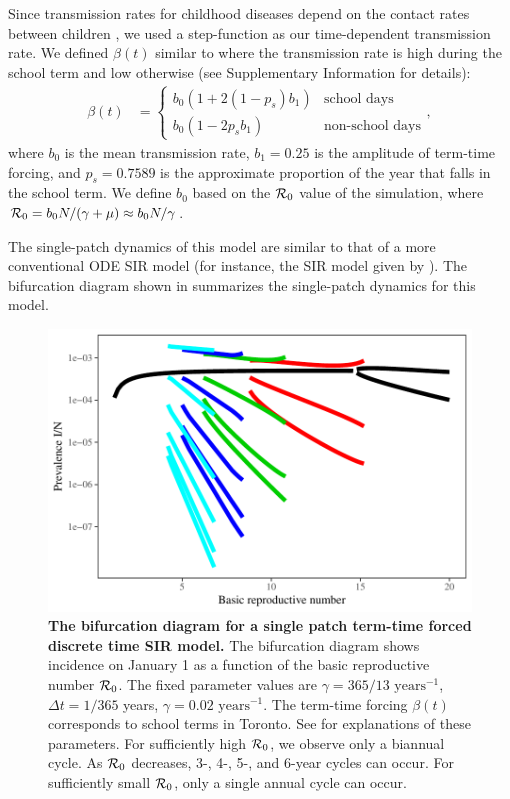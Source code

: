 \documentclass[12pt]{article}
\newcommand{\R}{{\cal R}}
\begin{document}
Since transmission rates for childhood diseases depend on the contact rates between children \cite{keeling2002understanding}, we used a step-function as our time-dependent transmission rate. We defined $\beta (t)$ similar to \cite{bauch2003interepidemic} where the transmission rate is high during the school term and low otherwise (see Supplementary Information for details):
\begin{equation}
\begin{aligned}
\beta (t) &=
\begin{cases} b_0 (1 + 2(1 - p_s) b_1) &\mbox{school days} \\
b_0 (1 - 2 p_s b_1) & \mbox{non-school days}
\end{cases},
\end{aligned}
\end{equation}
where $b_0$ is the mean transmission rate, $b_1 = 0.25$ is the amplitude of term-time forcing, and $p_s = 0.7589$ is the approximate proportion of the year that falls in the school term. We define $b_0$ based on the $\R_0$ value of the simulation, where $\R_0 = b_0 N / (\gamma + \mu) \approx b_0 N / \gamma$.

The single-patch dynamics of this model are similar to that of a more conventional ODE SIR model (for instance, the SIR model given by \cite{earn2000simple}). The bifurcation diagram shown in  summarizes the single-patch dynamics for this model.

\begin{figure}
\centering
\includegraphics[width=\textwidth]{supplementary/bifurcation.pdf}
\caption{\textbf{The bifurcation diagram for a single patch term-time forced discrete time SIR model.}
The bifurcation diagram shows incidence on January 1 as a function of the basic reproductive number $\R_0$. The fixed parameter values are $\gamma = 365/13 \textrm{ years}^{-1}$, $\Delta t = 1/365$ years, $\gamma = 0.02 \textrm{ years}^{-1}$. The term-time forcing $\beta(t)$ corresponds to school terms in Toronto. See  for explanations of these parameters. For sufficiently high $\R_0$, we observe only a biannual cycle. As $\R_0$ decreases, 3-, 4-, 5-, and 6-year cycles can occur. For sufficiently small $\R_0$, only a single annual cycle can occur. }
\label{fig:bifurcation}
\end{figure}
\end{document}
